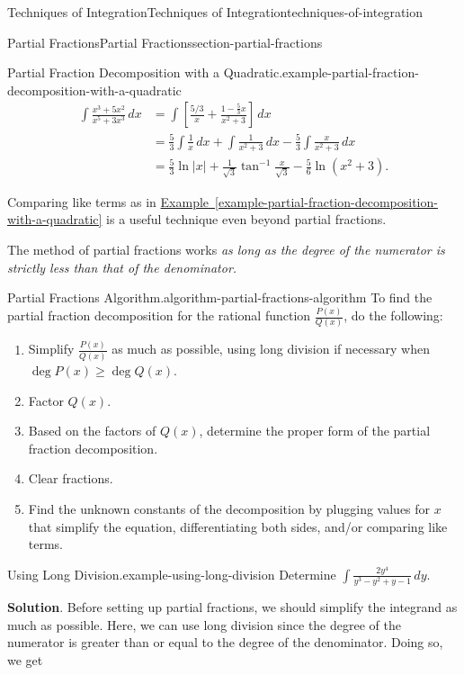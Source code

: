 \documentclass[oneside,10pt,]{book}
\numberwithin{equation}{section}
\begin{document}
\begin{chapterptx}{Techniques of Integration}{}{Techniques of Integration}{}{}{techniques-of-integration}
\begin{sectionptx}{Partial Fractions}{}{Partial Fractions}{}{}{section-partial-fractions}
\begin{example}{Partial Fraction Decomposition with a Quadratic.}{example-partial-fraction-decomposition-with-a-quadratic}
\begin{align*}
\int\frac{x^{3} + 5x^{2}}{x^{5} + 3x^{3}}\,dx & = \int\left[\frac{5/3}{x} + \frac{1 - \frac{5}{3}x}{x^{2} + 3}\right]\,dx \\
& = \frac{5}{3}\int\frac{1}{x}\,dx + \int\frac{1}{x^{2} + 3}\,dx - \frac{5}{3}\int\frac{x}{x^{2} + 3}\,dx \\
& = \frac{5}{3}\ln|x| + \frac{1}{\sqrt{3}}\tan^{-1}\frac{x}{\sqrt{3}} - \frac{5}{6}\ln(x^{2} + 3). 
\end{align*}
%
\end{example}
\hypertarget{p-564}{}%
Comparing like terms as in \hyperref[example-partial-fraction-decomposition-with-a-quadratic]{Example~\ref{example-partial-fraction-decomposition-with-a-quadratic}} is a useful technique even beyond partial fractions.%
\par
\hypertarget{p-565}{}%
The method of partial fractions works \emph{as long as the degree of the numerator is strictly less than that of the denominator.}%
\begin{algorithm}{Partial Fractions Algorithm.}{}{algorithm-partial-fractions-algorithm}%
\hypertarget{p-566}{}%
To find the partial fraction decomposition for the rational function \(\frac{P(x)}{Q(x)}\), do the following:\leavevmode%
\begin{enumerate}
\item\hypertarget{li-47}{}Simplify \(\frac{P(x)}{Q(x)}\) as much as possible, using long division if necessary when \(\deg P(x) \geq \deg Q(x)\).%
\item\hypertarget{li-48}{}Factor \(Q(x)\).%
\item\hypertarget{li-49}{}Based on the factors of \(Q(x)\), determine the proper form of the partial fraction decomposition.%
\item\hypertarget{li-50}{}Clear fractions.%
\item\hypertarget{li-51}{}Find the unknown constants of the decomposition by plugging values for \(x\) that simplify the equation, differentiating both sides, and\slash{}or comparing like terms.%
\end{enumerate}
%
\end{algorithm}
\begin{example}{Using Long Division.}{example-using-long-division}%
\hypertarget{p-567}{}%
Determine \(\int\frac{2y^{4}}{y^{3} - y^{2} + y - 1}\,dy\).%
\par\smallskip%
\noindent\textbf{Solution}.\hypertarget{solution-124}{}\quad%
\hypertarget{p-568}{}%
Before setting up partial fractions, we should simplify the integrand as much as possible. Here, we can use long division since the degree of the numerator is greater than or equal to the degree of the denominator. Doing so, we get%

\end{example}
\end{sectionptx}
\end{chapterptx}
\end{document}
